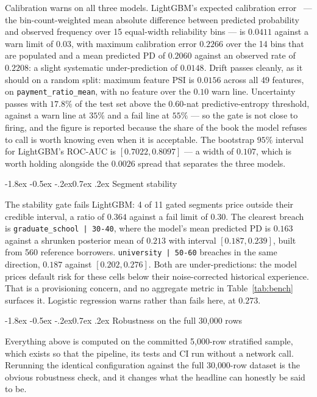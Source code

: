 \documentclass[10pt,a4paper]{article}
\makeatletter
\renewcommand\subsection{\@startsection{subsection}{2}{\z@}%
  {-1.8ex \@plus -0.5ex \@minus -.2ex}{0.7ex \@plus .2ex}%
  {\normalfont\normalsize\bfseries}}
\newcommand{\code}[1]{\texttt{\small #1}}
\makeatother
\begin{document}
Calibration warns on all three models. LightGBM's expected calibration
error~\cite{naeini2015} --- the bin-count-weighted mean absolute difference between
predicted probability and observed frequency over 15 equal-width reliability bins
--- is $0.0411$ against a warn limit of $0.03$, with maximum calibration error
$0.2266$ over the 14 bins that are populated and a mean predicted PD of $0.2060$
against an observed rate of $0.2208$: a slight systematic under-prediction of
$0.0148$. Drift passes cleanly, as it should on a random split: maximum feature PSI
is $0.0156$ across all 49 features, on \code{payment\_ratio\_mean}, with no feature
over the $0.10$ warn line. Uncertainty passes with $17.8\%$ of the test set above
the $0.60$-nat predictive-entropy threshold, against a warn line at $35\%$ and a
fail line at $55\%$ --- so the gate is not close to firing, and the figure is
reported because the share of the book the model refuses to call is worth knowing
even when it is acceptable. The bootstrap $95\%$ interval for LightGBM's ROC-AUC is
$[0.7022, 0.8097]$ --- a width of $0.107$, which is worth holding alongside the
$0.0026$ spread that separates the three models.

\subsection{Segment stability}

The stability gate fails LightGBM: 4 of 11 gated segments price outside their
credible interval, a ratio of $0.364$ against a fail limit of $0.30$. The
clearest breach is \code{graduate\_school | 30-40}, where the model's mean
predicted PD is $0.163$ against a shrunken posterior mean of $0.213$ with
interval $[0.187, 0.239]$, built from 560 reference borrowers. \code{university |
50-60} breaches in the same direction, $0.187$ against $[0.202, 0.276]$. Both
are under-predictions: the model prices default risk for these cells below their
noise-corrected historical experience. That is a provisioning concern, and no
aggregate metric in Table~\ref{tab:bench} surfaces it. Logistic regression warns
rather than fails here, at $0.273$.

\subsection{Robustness on the full 30{,}000 rows}
\label{sec:full}

Everything above is computed on the committed 5{,}000-row stratified sample, which
exists so that the pipeline, its tests and CI run without a network call. Rerunning
the identical configuration against the full 30{,}000-row dataset is the obvious
robustness check, and it changes what the headline can honestly be said to be.
\end{document}
